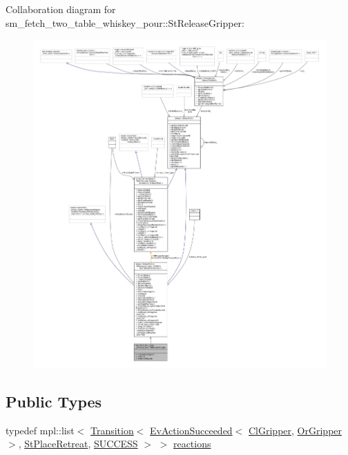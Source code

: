 Collaboration diagram for sm\+\_\+fetch\+\_\+two\+\_\+table\+\_\+whiskey\+\_\+pour\+:\+:St\+Release\+Gripper\+:
\nopagebreak
\begin{figure}[H]
\begin{center}
\leavevmode
\includegraphics[width=350pt]{structsm__fetch__two__table__whiskey__pour_1_1StReleaseGripper__coll__graph}
\end{center}
\end{figure}
\subsection*{Public Types}
\begin{DoxyCompactItemize}
\item 
typedef mpl\+::list$<$ \hyperlink{classsmacc_1_1Transition}{Transition}$<$ \hyperlink{structsmacc_1_1default__events_1_1EvActionSucceeded}{Ev\+Action\+Succeeded}$<$ \hyperlink{classsm__fetch__two__table__whiskey__pour_1_1cl__gripper_1_1ClGripper}{Cl\+Gripper}, \hyperlink{classsm__fetch__two__table__whiskey__pour_1_1OrGripper}{Or\+Gripper} $>$, \hyperlink{structsm__fetch__two__table__whiskey__pour_1_1StPlaceRetreat}{St\+Place\+Retreat}, \hyperlink{structsmacc_1_1default__transition__tags_1_1SUCCESS}{S\+U\+C\+C\+E\+SS} $>$ $>$ \hyperlink{structsm__fetch__two__table__whiskey__pour_1_1StReleaseGripper_aded50b4d3420ac565f015cb60e6aac43}{reactions}
\end{DoxyCompactItemize}
